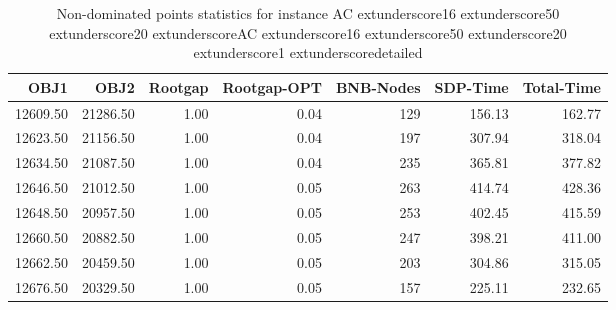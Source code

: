 \begin{table}
\caption{Non-dominated points statistics for instance AC	extunderscore16	extunderscore50	extunderscore20	extunderscoreAC	extunderscore16	extunderscore50	extunderscore20	extunderscore1	extunderscoredetailed}
\label{tab:stats/AC_16_50_20_AC_16_50_20_1_detailed}
\begin{tabular}{rrrrrrr}
\toprule
OBJ1 & OBJ2 & Rootgap & Rootgap-OPT & BNB-Nodes & SDP-Time & Total-Time \\
\midrule
12609.50 & 21286.50 & 1.00 & 0.04 & 129 & 156.13 & 162.77 \\
12623.50 & 21156.50 & 1.00 & 0.04 & 197 & 307.94 & 318.04 \\
12634.50 & 21087.50 & 1.00 & 0.04 & 235 & 365.81 & 377.82 \\
12646.50 & 21012.50 & 1.00 & 0.05 & 263 & 414.74 & 428.36 \\
12648.50 & 20957.50 & 1.00 & 0.05 & 253 & 402.45 & 415.59 \\
12660.50 & 20882.50 & 1.00 & 0.05 & 247 & 398.21 & 411.00 \\
12662.50 & 20459.50 & 1.00 & 0.05 & 203 & 304.86 & 315.05 \\
12676.50 & 20329.50 & 1.00 & 0.05 & 157 & 225.11 & 232.65 \\
\bottomrule
\end{tabular}
\end{table}
